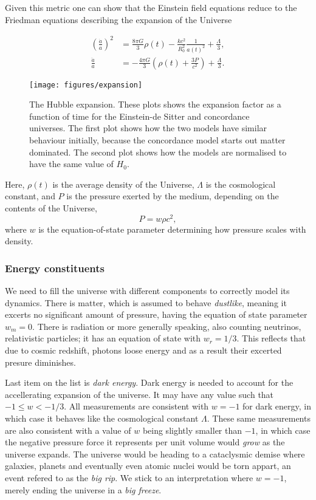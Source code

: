 Given this metric one can show that the Einstein field equations reduce to the Friedman equations describing the expansion of the Universe
\begin{shaded*}
    \begin{align}
    {\left(\frac{\dot{a}}{a}\right)}^2 &= \frac{8 \pi G}{3} \rho(t) -
    \frac{kc^2}{R_0^2} \frac{1}{{a(t)}^2} + \frac{\Lambda}{3},\\
    \frac{\ddot{a}}{a} &= - \frac{4 \pi G}{3} \left(\rho(t) +
    \frac{3 P}{c^2}\right) +
    \frac{\Lambda}{3}.
    \label{eq:friedman}
    \end{align}
\end{shaded*}

\begin{figure}
    \centering
    \texttt{[image: figures/expansion]}
    \caption{The Hubble expansion. These plots shows the expansion factor as a function of time for the Einstein-de Sitter and concordance universes. The first plot shows how the two models have similar behaviour initially, because the concordance model starts out matter dominated. The second plot shows how the models are normalised to have the same value of $H_0$.} \label{fig:hubble-expansion}
\end{figure}

Here, $\rho(t)$ is the average density of the Universe, $\Lambda$ is the cosmological constant, and $P$ is the pressure exerted by the medium, depending on the contents of the Universe,
\[P = w \rho c^2,\]
where $w$ is the equation-of-state parameter determining how pressure scales with density.

\subsubsection{Energy constituents}
We need to fill the universe with different components to correctly model its dynamics. There is matter, which is assumed to behave \emph{dustlike}, meaning it excerts no significant amount of pressure, having the equation of state parameter $w_m = 0$. There is radiation or more generally speaking, also counting neutrinos, relativistic particles; it has an equation of state with $w_r = 1/3$. This reflects that due to cosmic redshift, photons loose energy and as a result their excerted presure diminishes.

Last item on the list is \emph{dark energy}. Dark energy is needed to account for the accellerating expansion of the universe. It may have any value such that $-1 \le w < -1/3$. All measurements are consistent with $w = -1$ for dark energy, in which case it behaves like the cosmological constant $\Lambda$. These same measurements are also consistent with a value of $w$ being slightly smaller than $-1$, in which case the negative pressure force it represents per unit volume would \emph{grow} as the universe expands. The universe would be heading to a cataclysmic demise where galaxies, planets and eventually even atomic nuclei would be torn appart, an event refered to as the \emph{big rip}. We stick to an interpretation where $w = -1$, merely ending the universe in a \emph{big freeze}.

